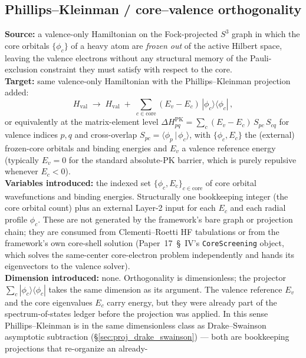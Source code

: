 \documentclass[11pt]{article}
\begin{document}
\subsection{Phillips--Kleinman / core--valence orthogonality}
\label{sec:proj_phillips_kleinman}
\textbf{Source:} a valence-only Hamiltonian on the Fock-projected $S^3$
graph in which the core orbitals $\{\phi_c\}$ of a heavy atom are
\emph{frozen out} of the active Hilbert space, leaving the valence
electrons without any structural memory of the Pauli-exclusion
constraint they must satisfy with respect to the core.\\
\textbf{Target:} same valence-only Hamiltonian with the Phillips--Kleinman
projection added:
\begin{equation*}
  H_\text{val} \;\longrightarrow\; H_\text{val}
  \;+\; \sum_{c \in \text{core}} (E_v - E_c)\,
  |\phi_c\rangle\langle\phi_c|\,,
\end{equation*}
or equivalently at the matrix-element level
$\Delta H_{pq}^\text{PK} = \sum_c (E_v - E_c)\,S_{pc}\,S_{cq}$ for
valence indices $p,q$ and cross-overlap $S_{pc} = \langle\phi_p\,
|\,\phi_c\rangle$, with $\{\phi_c, E_c\}$ the (external) frozen-core
orbitals and binding energies and $E_v$ a valence reference energy
(typically $E_v = 0$ for the standard absolute-PK barrier, which is
purely repulsive whenever $E_c < 0$).\\
\textbf{Variables introduced:} the indexed set
$\{\phi_c, E_c\}_{c \in \text{core}}$ of core orbital wavefunctions
and binding energies.  Structurally one bookkeeping integer (the
core orbital count) plus an external Layer-2 input for each $E_c$ and
each radial profile $\phi_c$.  These are not generated by the
framework's bare graph or projection chain; they are consumed from
Clementi--Roetti HF tabulations or from the framework's own core-shell
solution (Paper~17~\S~IV's \texttt{CoreScreening} object,
which solves the same-center core-electron problem independently and
hands its eigenvectors to the valence solver).\\
\textbf{Dimension introduced:} none.  Orthogonality is dimensionless;
the projector $\sum_c |\phi_c\rangle\langle\phi_c|$ takes the same
dimension as its argument.  The valence reference $E_v$ and the
core eigenvalues $E_c$ carry energy, but they were already part of the
spectrum-of-states ledger before the projection was applied.  In this
sense Phillips--Kleinman is in the same dimensionless class as
Drake--Swainson asymptotic subtraction (\S\ref{sec:proj_drake_swainson})
--- both are bookkeeping projections that re-organize an already-
\end{document}
